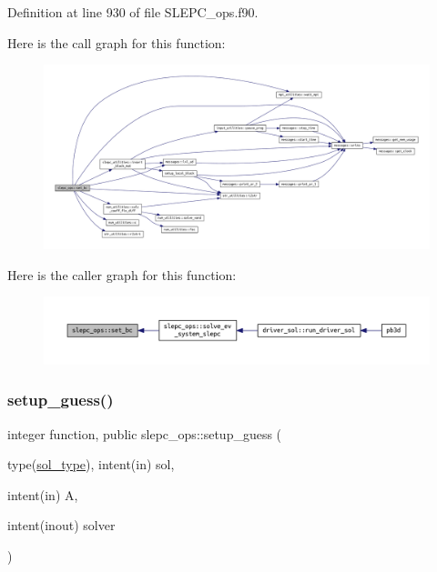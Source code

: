 Definition at line 930 of file S\+L\+E\+P\+C\+\_\+ops.\+f90.

Here is the call graph for this function\+:\nopagebreak
\begin{figure}[H]
\begin{center}
\leavevmode
\includegraphics[width=350pt]{namespaceslepc__ops_a05f8a23335ed47ad1996cddf3bcfdc2e_cgraph}
\end{center}
\end{figure}
Here is the caller graph for this function\+:\nopagebreak
\begin{figure}[H]
\begin{center}
\leavevmode
\includegraphics[width=350pt]{namespaceslepc__ops_a05f8a23335ed47ad1996cddf3bcfdc2e_icgraph}
\end{center}
\end{figure}
\mbox{\label{namespaceslepc__ops_a17a57b58ac6ca48ff4bdb44e8689bb19}} 
\subsubsection{\texorpdfstring{setup\+\_\+guess()}{setup\_guess()}}
{\footnotesize\ttfamily integer function, public slepc\+\_\+ops\+::setup\+\_\+guess (\begin{DoxyParamCaption}\item[{type(\hyperlink{structsol__vars_1_1sol__type}{sol\+\_\+type}), intent(in)}]{sol,  }\item[{intent(in)}]{A,  }\item[{intent(inout)}]{solver }\end{DoxyParamCaption})}



